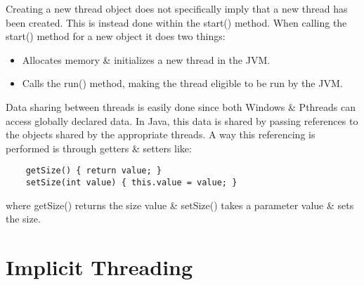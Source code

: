 \documentclass[a4paper,11pt]{article}
\begin{document}
\noindent Creating a new thread object does not specifically imply that a new thread has been created. This is instead done within the start() method. When calling the start() method for a new object it does two things:
\begin{itemize}
    \item Allocates memory \& initializes a new thread in the JVM.
    \item Calls the run() method, making the thread eligible to be run by the JVM.
\end{itemize}
Data sharing between threads is easily done since both Windows \& Pthreads can access globally declared data. In Java, this data is shared by passing references to the objects shared by the appropriate threads.\cite{Operatingsystemconcepts} 
\newline\noindent A way this referencing is performed is through getters \& setters like:
\begin{verbatim}
    getSize() { return value; }
    setSize(int value) { this.value = value; }
\end{verbatim}
where getSize() returns the size value \& setSize() takes a parameter value \& sets the size.
\newpage\section{Implicit Threading}
\end{document}
